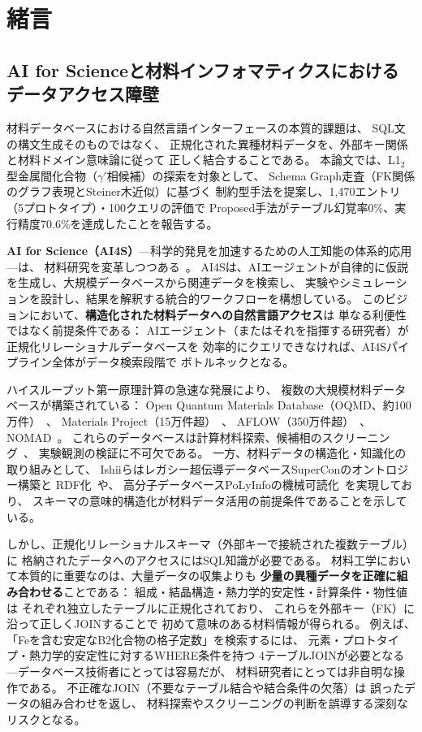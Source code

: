 \documentclass[5p,twocolumn]{elsarticle}
\begin{document}
\section{緒言}
\label{sec:introduction}

\subsection{AI for Scienceと材料インフォマティクスにおけるデータアクセス障壁}

材料データベースにおける自然言語インターフェースの本質的課題は、
SQL文の構文生成そのものではなく、
正規化された異種材料データを、外部キー関係と材料ドメイン意味論に従って
正しく結合することである。
本論文では、L1$_2$型金属間化合物（$\gamma'$相候補）の探索を対象として、
Schema Graph走査（FK関係のグラフ表現とSteiner木近似）に基づく
制約型手法を提案し、1{,}470エントリ（5プロトタイプ）・100クエリの評価で
Proposed手法がテーブル幻覚率0\%、実行精度70.6\%を達成したことを報告する。

\textbf{AI for Science（AI4S）}---科学的発見を加速するための人工知能の体系的応用---は、
材料研究を変革しつつある~\citep{wang2023ai4s,himanen2019dscribe}。
AI4Sは、AIエージェントが自律的に仮説を生成し、大規模データベースから関連データを検索し、
実験やシミュレーションを設計し、結果を解釈する統合的ワークフローを構想している。
このビジョンにおいて、\textbf{構造化された材料データへの自然言語アクセス}は
単なる利便性ではなく前提条件である：
AIエージェント（またはそれを指揮する研究者）が正規化リレーショナルデータベースを
効率的にクエリできなければ、AI4Sパイプライン全体がデータ検索段階で
ボトルネックとなる。

ハイスループット第一原理計算の急速な発展により、
複数の大規模材料データベースが構築されている：
Open Quantum Materials Database（OQMD、約100万件）~\citep{saal2013oqmd,kirklin2015oqmd}、
Materials Project（15万件超）~\citep{jain2013mp}、
AFLOW（350万件超）~\citep{curtarolo2012aflow}、
NOMAD~\citep{draxl2019nomad}。
これらのデータベースは計算材料探索、候補相のスクリーニング~\citep{senkov2018hea,george2019hea}、
実験観測の検証に不可欠である。
一方、材料データの構造化・知識化の取り組みとして、
Ishiiらはレガシー超伝導データベースSuperConのオントロジー構築と
RDF化~\cite{ishii2023supercon}や、
高分子データベースPoLyInfoの機械可読化~\cite{ishii2024polyinfo}を実現しており、
スキーマの意味的構造化が材料データ活用の前提条件であることを示している。

しかし、正規化リレーショナルスキーマ（外部キーで接続された複数テーブル）に
格納されたデータへのアクセスにはSQL知識が必要である。
材料工学において本質的に重要なのは、大量データの収集よりも
\textbf{少量の異種データを正確に組み合わせる}ことである：
組成・結晶構造・熱力学的安定性・計算条件・物性値は
それぞれ独立したテーブルに正規化されており、
これらを外部キー（FK）に沿って正しくJOINすることで
初めて意味のある材料情報が得られる。
例えば、「Feを含む安定なB2化合物の格子定数」を検索するには、
元素・プロトタイプ・熱力学的安定性に対するWHERE条件を持つ
4テーブルJOINが必要となる---データベース技術者にとっては容易だが、
材料研究者にとっては非自明な操作である。
不正確なJOIN（不要なテーブル結合や結合条件の欠落）は
誤ったデータの組み合わせを返し、
材料探索やスクリーニングの判断を誤導する深刻なリスクとなる。
\end{document}
